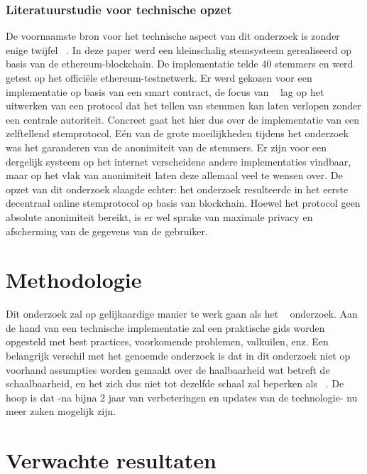 \subsubsection*{Literatuurstudie voor technische opzet}

De voornaamste bron voor het technische aspect van dit onderzoek is zonder enige twijfel ~\textcite{McCorry2017}. In deze paper werd een kleinschalig stemsysteem gerealiseerd op basis van de ethereum-blockchain. De implementatie telde 40 stemmers en werd getest op het officiële ethereum-testnetwerk. Er werd gekozen voor een implementatie op basis van een smart contract, de focus van ~\textcite{McCorry2017} lag op het uitwerken van een protocol dat het tellen van stemmen kan laten verlopen zonder een centrale autoriteit. Concreet gaat het hier dus over de implementatie van een zelftellend stemprotocol. Eén van de grote moeilijkheden tijdens het onderzoek was het garanderen van de anonimiteit van de stemmers. Er zijn voor een dergelijk systeem op het internet verscheidene andere implementaties vindbaar, maar op het vlak van anonimiteit  laten deze allemaal veel te wensen over. De opzet van dit onderzoek slaagde echter: het onderzoek resulteerde in het eerste decentraal online stemprotocol op basis van blockchain. Hoewel het protocol geen absolute anonimiteit bereikt, is er wel sprake van maximale privacy en afscherming van de gegevens van de gebruiker.

\section{Methodologie}
\label{sec:methodologie}

Dit onderzoek zal op gelijkaardige manier te werk gaan als het ~\textcite{McCorry2017} onderzoek. Aan de hand van een technische implementatie zal een praktische gids worden opgesteld met best practices, voorkomende problemen, valkuilen, enz. Een belangrijk verschil met het genoemde onderzoek is dat in dit onderzoek niet op voorhand assumpties worden gemaakt over de haalbaarheid  wat betreft de schaalbaarheid, en het zich dus niet tot dezelfde schaal zal beperken als ~\textcite{McCorry2017}. De hoop is dat -na bijna 2 jaar van verbeteringen en updates van de technologie- nu meer zaken mogelijk zijn.

\section{Verwachte resultaten}
\label{sec:verwachte_resultaten}

